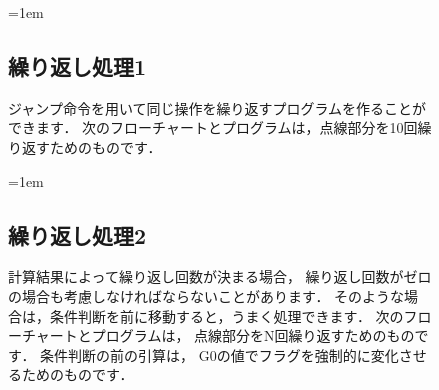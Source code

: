 \begin{figure}[btp]
  \begin{framed}{\parindent=1em
      \subsection*{繰り返し処理1}
      ジャンプ命令を用いて同じ操作を繰り返すプログラムを作ることができます．
      次のフローチャートとプログラムは，点線部分を10回繰り返すためのものです．

      \begin{center}
      \end{center}
  }\end{framed}
\end{figure}

\begin{figure}[btp]
  \begin{framed}{\parindent=1em
      \subsection*{繰り返し処理2}
      計算結果によって繰り返し回数が決まる場合，
      繰り返し回数がゼロの場合も考慮しなければならないことがあります．
      そのような場合は，条件判断を前に移動すると，うまく処理できます．
      次のフローチャートとプログラムは，
      点線部分をN回繰り返すためのものです．
      条件判断の前の引算は，
      G0の値でフラグを強制的に変化させるためのものです．

      \begin{center}
      \end{center}
  }\end{framed}
\end{figure}

